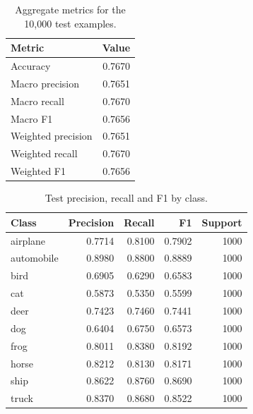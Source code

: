 \begin{table}[htbp]\centering\small
\caption{Aggregate metrics for the 10,000 test examples.}
\begin{tabular}{@{}lr@{}}\toprule
Metric & Value\\\midrule
Accuracy & 0.7670\\
Macro precision & 0.7651\\
Macro recall & 0.7670\\
Macro F1 & 0.7656\\
Weighted precision & 0.7651\\
Weighted recall & 0.7670\\
Weighted F1 & 0.7656\\
\bottomrule\end{tabular}\end{table}
\begin{table}[htbp]\centering\small
\caption{Test precision, recall and F1 by class.}
\begin{tabular}{@{}lrrrr@{}}\toprule
Class & Precision & Recall & F1 & Support\\\midrule
airplane & 0.7714 & 0.8100 & 0.7902 & 1000\\
automobile & 0.8980 & 0.8800 & 0.8889 & 1000\\
bird & 0.6905 & 0.6290 & 0.6583 & 1000\\
cat & 0.5873 & 0.5350 & 0.5599 & 1000\\
deer & 0.7423 & 0.7460 & 0.7441 & 1000\\
dog & 0.6404 & 0.6750 & 0.6573 & 1000\\
frog & 0.8011 & 0.8380 & 0.8192 & 1000\\
horse & 0.8212 & 0.8130 & 0.8171 & 1000\\
ship & 0.8622 & 0.8760 & 0.8690 & 1000\\
truck & 0.8370 & 0.8680 & 0.8522 & 1000\\
\bottomrule\end{tabular}\end{table}
